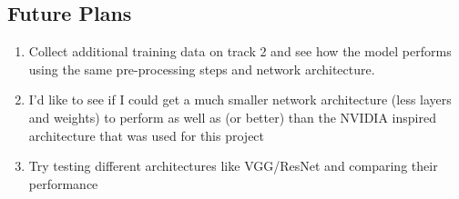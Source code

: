 \documentclass[11pt]{article}
\providecommand{\tightlist}{%
      \setlength{\itemsep}{0pt}\setlength{\parskip}{0pt}}
\begin{document}
\subsection{Future Plans}\label{future-plans}

\begin{enumerate}
\def\labelenumi{\arabic{enumi}.}
\tightlist
\item
  Collect additional training data on track 2 and see how the model
  performs using the same pre-processing steps and network architecture.
\item
  I'd like to see if I could get a much smaller network architecture
  (less layers and weights) to perform as well as (or better) than the
  NVIDIA inspired architecture that was used for this project
\item
  Try testing different architectures like VGG/ResNet and comparing
  their performance
\end{enumerate}


    
    
    
    
\end{document}
